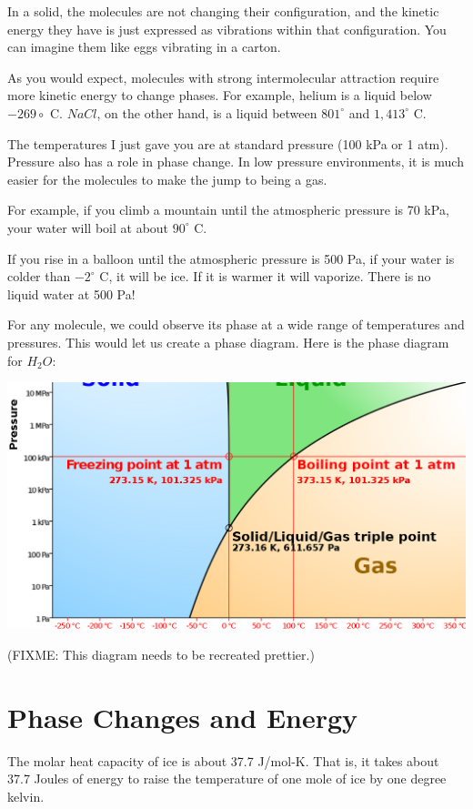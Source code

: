 In a solid, the molecules are not changing their configuration, and the kinetic energy they have is just expressed as vibrations within that configuration. You can imagine them like eggs vibrating in a carton.

As you would expect, molecules with strong intermolecular attraction require more kinetic energy to change phases. For example, helium is a liquid below $-269\circ$ C. $NaCl$, on the other hand, is a liquid between $801^\circ$ and $1,413^\circ$ C. 

The temperatures I just gave you are at standard pressure (100 kPa or 1 atm). Pressure also has a role in phase change. In low pressure environments, it is much easier for the molecules to make the jump to being a gas.

For example, if you climb a mountain until the atmospheric pressure is 70 kPa, your water will boil at about $90^\circ$ C. 

If you rise in a balloon until the atmospheric pressure is 500 Pa, if your water is colder than $-2^\circ$ C, it will be ice. If it is warmer it will vaporize.  There is no liquid water at 500 Pa!

For any molecule, we could observe its phase at a wide range of temperatures and pressures. This would let us create a phase diagram. Here is the phase diagram for $H_2O$:

\includegraphics[width=\textwidth]{waterphase_edit.png}

(FIXME: This diagram needs to be recreated prettier.)

\section{Phase Changes and Energy}

The molar heat capacity of ice is about 37.7 J/mol-K. That is, it takes about 37.7 Joules of energy to raise the temperature of one mole of ice by one degree kelvin.

